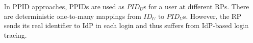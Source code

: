 






In PPID approaches, PPIDs are used as $PID_U$s for a user at different RPs. There are deterministic one-to-many mappings from $ID_U$ to $PID_U$s.
However, the RP sends its real identifier to IdP in each login and thus suffers from IdP-based login tracing.

